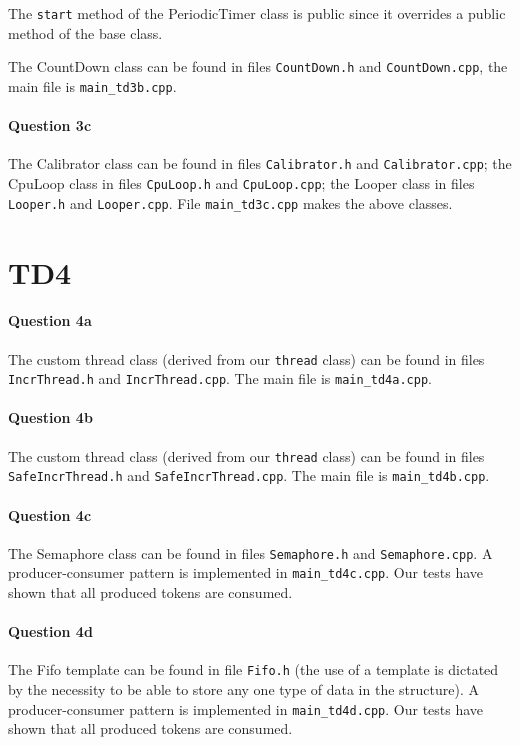 \documentclass[a4paper,oneside,11pt]{article}
\begin{document}
The \texttt{start} method of the PeriodicTimer class is public since it overrides a public method of the base class.

The CountDown class can be found in files \texttt{CountDown.h} and \texttt{CountDown.cpp}, the main file is \texttt{main\_td3b.cpp}.

\paragraph{Question 3c} The Calibrator class can be found in files \texttt{Calibrator.h} and \texttt{Calibrator.cpp}; the CpuLoop class in files \texttt{CpuLoop.h} and \texttt{CpuLoop.cpp}; the Looper class in files \texttt{Looper.h} and \texttt{Looper.cpp}. File \texttt{main\_td3c.cpp} makes the above classes.

\section*{TD4}
\paragraph{Question 4a} The custom thread class (derived from our \texttt{thread} class) can be found in files \texttt{IncrThread.h} and \texttt{IncrThread.cpp}. The main file is \texttt{main\_td4a.cpp}.

\paragraph{Question 4b} The custom thread class (derived from our \texttt{thread} class) can be found in files \texttt{SafeIncrThread.h} and \texttt{SafeIncrThread.cpp}. The main file is \texttt{main\_td4b.cpp}.

\paragraph{Question 4c} The Semaphore class can be found in files \texttt{Semaphore.h} and \texttt{Semaphore.cpp}. A producer-consumer pattern is implemented in \texttt{main\_td4c.cpp}. Our tests have shown that all produced tokens are consumed.

\paragraph{Question 4d} The Fifo template can be found in file \texttt{Fifo.h} (the use of a template is dictated by the necessity to be able to store any one type of data in the structure). A producer-consumer pattern is implemented in \texttt{main\_td4d.cpp}. Our tests have shown that all produced tokens are consumed.
\end{document}
